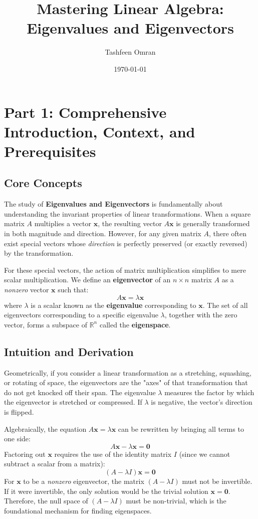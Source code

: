\documentclass[11pt, a4paper]{article}
\theoremstyle{definition}
\theoremstyle{remark}
\newcommand{\R}{\mathbb{R}}
\begin{document}
\title{\textbf{Mastering Linear Algebra: Eigenvalues and Eigenvectors}}
\author{Tashfeen Omran}
\date{\today}

\maketitle
\tableofcontents
\newpage

\section{Part 1: Comprehensive Introduction, Context, and Prerequisites}

\subsection{Core Concepts}
The study of \textbf{Eigenvalues and Eigenvectors} is fundamentally about understanding the invariant properties of linear transformations. When a square matrix $A$ multiplies a vector $\mathbf{x}$, the resulting vector $A\mathbf{x}$ is generally transformed in both magnitude and direction. However, for any given matrix $A$, there often exist special vectors whose \textit{direction} is perfectly preserved (or exactly reversed) by the transformation. 

For these special vectors, the action of matrix multiplication simplifies to mere scalar multiplication. We define an \textbf{eigenvector} of an $n \times n$ matrix $A$ as a \textit{nonzero} vector $\mathbf{x}$ such that:
\[ A\mathbf{x} = \lambda \mathbf{x} \]
where $\lambda$ is a scalar known as the \textbf{eigenvalue} corresponding to $\mathbf{x}$. The set of all eigenvectors corresponding to a specific eigenvalue $\lambda$, together with the zero vector, forms a subspace of $\R^n$ called the \textbf{eigenspace}.

\subsection{Intuition and Derivation}
Geometrically, if you consider a linear transformation as a stretching, squashing, or rotating of space, the eigenvectors are the "axes" of that transformation that do not get knocked off their span. The eigenvalue $\lambda$ measures the factor by which the eigenvector is stretched or compressed. If $\lambda$ is negative, the vector's direction is flipped.

Algebraically, the equation $A\mathbf{x} = \lambda \mathbf{x}$ can be rewritten by bringing all terms to one side:
\[ A\mathbf{x} - \lambda \mathbf{x} = \mathbf{0} \]
Factoring out $\mathbf{x}$ requires the use of the identity matrix $I$ (since we cannot subtract a scalar from a matrix):
\[ (A - \lambda I)\mathbf{x} = \mathbf{0} \]
For $\mathbf{x}$ to be a \textit{nonzero} eigenvector, the matrix $(A - \lambda I)$ must not be invertible. If it were invertible, the only solution would be the trivial solution $\mathbf{x} = \mathbf{0}$. Therefore, the null space of $(A - \lambda I)$ must be non-trivial, which is the foundational mechanism for finding eigenspaces.
\end{document}
